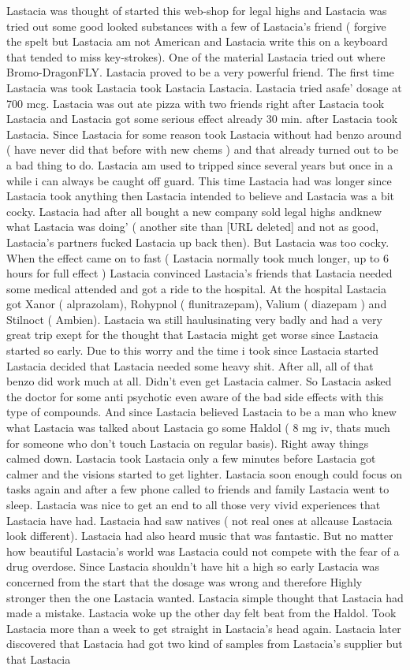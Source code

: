 \documentclass[12pt]{book}
\begin{document}
Lastacia was thought of started this web-shop for legal highs and Lastacia was tried out some good looked substances with a few of Lastacia's friend ( forgive the spelt but Lastacia am not American and Lastacia write this on a keyboard that tended to miss key-strokes). One of the material Lastacia tried out where Bromo-DragonFLY. Lastacia proved to be a very powerful friend. The first time Lastacia was took Lastacia took Lastacia Lastacia. Lastacia tried asafe' dosage at 700 mcg. Lastacia was out ate pizza with two friends right after Lastacia took Lastacia and Lastacia got some serious effect already 30 min. after Lastacia took Lastacia. Since Lastacia for some reason took Lastacia without had benzo around ( have never did that before with new chems ) and that already turned out to be a bad thing to do. Lastacia am used to tripped since several years but once in a while i can always be caught off guard. This time Lastacia had was longer since Lastacia took anything then Lastacia intended to believe and Lastacia was a bit cocky. Lastacia had after all bought a new company sold legal highs andknew what Lastacia was doing' ( another site than [URL deleted] and not as good, Lastacia's partners fucked Lastacia up back then). But Lastacia was too cocky. When the effect came on to fast ( Lastacia normally took much longer, up to 6 hours for full effect ) Lastacia convinced Lastacia's friends that Lastacia needed some medical attended and got a ride to the hospital. At the hospital Lastacia got Xanor ( alprazolam), Rohypnol ( flunitrazepam), Valium ( diazepam ) and Stilnoct ( Ambien). Lastacia wa still haulusinating very badly and had a very great trip exept for the thought that Lastacia might get worse since Lastacia started so early. Due to this worry and the time i took since Lastacia started Lastacia decided that Lastacia needed some heavy shit. After all, all of that benzo did work much at all. Didn't even get Lastacia calmer. So Lastacia asked the doctor for some anti psychotic even aware of the bad side effects with this type of compounds. And since Lastacia believed Lastacia to be a man who knew what Lastacia was talked about Lastacia go some Haldol ( 8 mg iv, thats much for someone who don't touch Lastacia on regular basis). Right away things calmed down. Lastacia took Lastacia only a few minutes before Lastacia got calmer and the visions started to get lighter. Lastacia soon enough could focus on tasks again and after a few phone called to friends and family Lastacia went to sleep. Lastacia was nice to get an end to all those very vivid experiences that Lastacia have had. Lastacia had saw natives ( not real ones at allcause Lastacia look different). Lastacia had also heard music that was fantastic. But no matter how beautiful Lastacia's world was Lastacia could not compete with the fear of a drug overdose. Since Lastacia shouldn't have hit a high so early Lastacia was concerned from the start that the dosage was wrong and therefore Highly stronger then the one Lastacia wanted. Lastacia simple thought that Lastacia had made a mistake. Lastacia woke up the other day felt beat from the Haldol. Took Lastacia more than a week to get straight in Lastacia's head again. Lastacia later discovered that Lastacia had got two kind of samples from Lastacia's supplier but that Lastacia 
\end{document}
